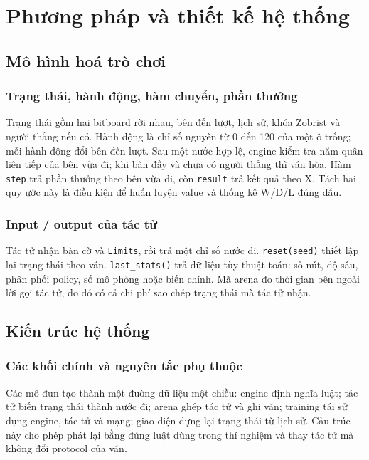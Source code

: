 \chapter{Phương pháp và thiết kế hệ thống}
\label{ch:phuong-phap}

\section{Mô hình hoá trò chơi}
\subsection{Trạng thái, hành động, hàm chuyển, phần thưởng}
Trạng thái gồm hai bitboard rời nhau, bên đến lượt, lịch sử, khóa Zobrist và người thắng nếu có. Hành động là chỉ số nguyên từ 0 đến 120 của một ô trống; mỗi hành động đổi bên đến lượt. Sau một nước hợp lệ, engine kiểm tra năm quân liên tiếp của bên vừa đi; khi bàn đầy và chưa có người thắng thì ván hòa. Hàm \texttt{step} trả phần thưởng theo bên vừa đi, còn \texttt{result} trả kết quả theo X. Tách hai quy ước này là điều kiện để huấn luyện value và thống kê W/D/L đúng dấu.
\subsection{Input / output của tác tử}
Tác tử nhận bàn cờ và \texttt{Limits}, rồi trả một chỉ số nước đi. \texttt{reset(seed)} thiết lập lại trạng thái theo ván. \texttt{last\_stats()} trả dữ liệu tùy thuật toán: số nút, độ sâu, phân phối policy, số mô phỏng hoặc biến chính. Mã arena đo thời gian bên ngoài lời gọi tác tử, do đó có cả chi phí sao chép trạng thái mà tác tử nhận.

\section{Kiến trúc hệ thống}
\subsection{Các khối chính và nguyên tắc phụ thuộc}
Các mô-đun tạo thành một đường dữ liệu một chiều: engine định nghĩa luật; tác tử biến trạng thái thành nước đi; arena ghép tác tử và ghi ván; training tái sử dụng engine, tác tử và mạng; giao diện dựng lại trạng thái từ lịch sử. Cấu trúc này cho phép phát lại bằng đúng luật dùng trong thí nghiệm và thay tác tử mà không đổi protocol của ván.
